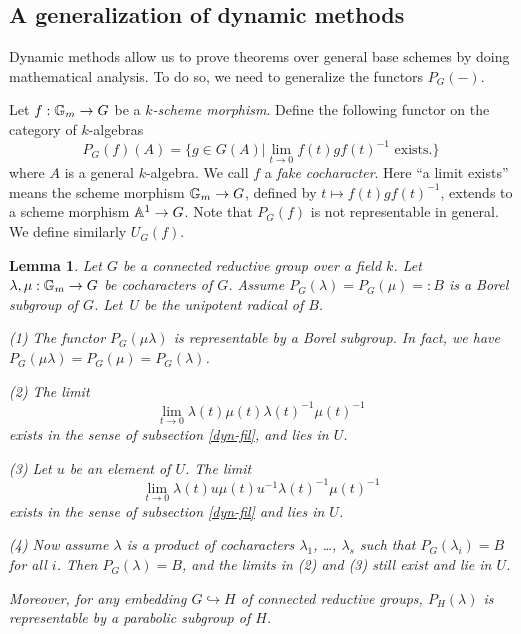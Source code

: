 \documentclass[10pt,a4paper,twoside]{article}
\newtheorem{lem}{Lemma}
\begin{document}
\subsection{A generalization of dynamic methods}
Dynamic methods allow us to prove theorems over general base schemes by doing 
mathematical analysis.
To do so, we need to generalize the functors $P_G(-)$.

Let $f: \mathbb{G}_m \to G$ be a \textit{$k$-scheme morphism}.
Define the following functor on the category of $k$-algebras
$$P_G(f)(A)=\{g\in G(A)|\lim_{t\to 0}f(t)g f(t)^{-1}\text{~exists.}\}$$
where $A$ is a general $k$-algebra. 
We call $f$ a \textit{fake cocharacter}.
Here ``a limit exists'' means
the scheme morphism  $\mathbb{G}_m \to G$, defined by $t\mapsto f(t)gf(t)^{-1}$,
extends to a scheme morphism ${\mathbb{A}}^1\to G$.
Note that $P_G(f)$ is not representable in general.
We define similarly $U_G(f)$.

\begin{lem}
\label{lem:more-dynamic}
Let $G$ be a connected reductive group over a field $k$.
Let $\lambda,\mu:\mathbb{G}_m\to G$
be cocharacters of $G$.
Assume $P_G(\lambda) = P_G(\mu)=:B$
is a Borel subgroup of $G$.
Let~$U$ be the unipotent radical of $B$.

(1)
The functor
$P_G(\mu\lambda)$ is representable by a Borel subgroup.
In fact, we have $P_G(\mu\lambda) = P_G(\mu)=P_G(\lambda)$.

(2)
The limit
$$
\lim _{t\to 0} \lambda(t)\mu(t)\lambda(t)^{-1}\mu(t)^{-1}
$$
exists in the sense of subsection \ref{dyn-fil}, and lies in $U$.

(3)
Let $u$ be an element of $U$.
The limit
$$
\lim _{t\to 0} \lambda(t)u \mu(t) u^{-1}\lambda(t)^{-1}\mu(t)^{-1}
$$
exists in the sense of subsection \ref{dyn-fil} and lies in $U$.

(4)
Now assume $\lambda$ is a product of cocharacters $\lambda_1$, \ldots, $\lambda_s$
such that $P_G(\lambda_i)=B$ for all $i$.
Then $P_G(\lambda)=B$, and the limits in (2) and (3)
still exist and lie in $U$.

Moreover, for any embedding $G \hookrightarrow H$ of connected reductive groups,
$P_H(\lambda)$ is representable by a parabolic subgroup of $H$.
\end{lem}
\end{document}
